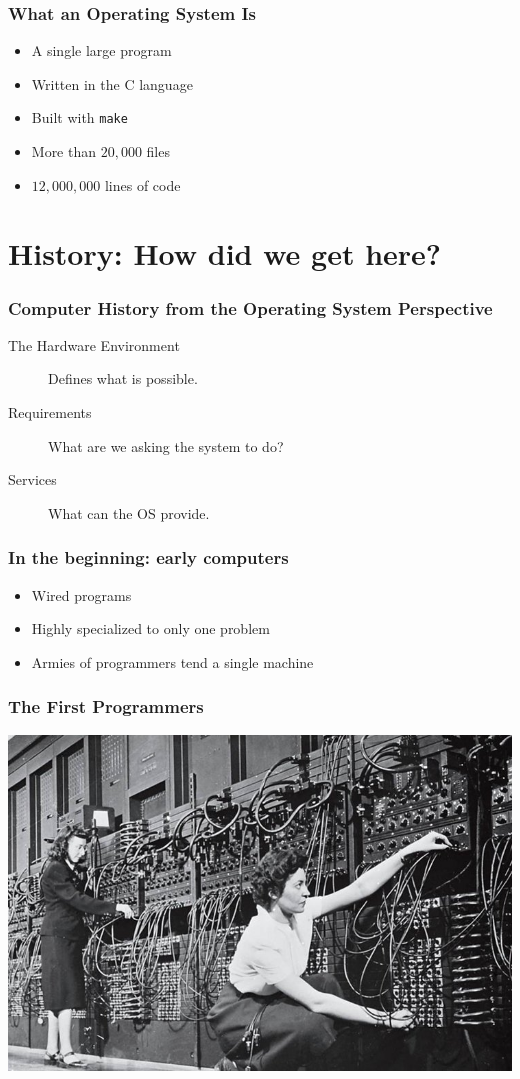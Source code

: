 \documentclass[pdftex]{beamer} %
\begin{document}
\begin{frame}[fragile]
  \frametitle{What an Operating System Is}
  \begin{itemize}
  \item A single large program
  \item Written in the C language
  \item Built with \texttt{make}
  \item More than $20,000$ files
  \item $12,000,000$ lines of code
  \end{itemize}
\end{frame}

\section{History: How did we get here?}

\begin{frame}
  \frametitle{Computer History from the Operating System Perspective}
  \begin{description}
  \item [The Hardware Environment] Defines what is possible.
  \item [Requirements] What are we asking the system to do?
  \item [Services] What can the OS provide.
  \end{description}
\end{frame}

\begin{frame}
  \frametitle{In the beginning: early computers}
  \begin{itemize}
  \item Wired programs
  \item Highly specialized to only one problem
  \item Armies of programmers tend a single machine
  \end{itemize}
\end{frame}

\begin{frame}
  \frametitle{The First Programmers}
  \includegraphics[width=\textwidth]{../../figures/first_programmers.jpg}
\end{frame}
\end{document}
